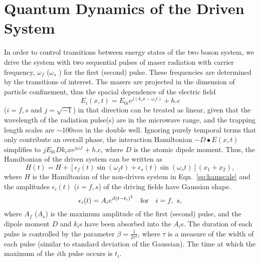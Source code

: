 \documentclass{article}
\begin{document}
\section{\label{sec:5} Quantum Dynamics of the Driven System}
%
%
In order to control transitions between energy states of the two boson system, we drive the 
system with  two sequential pulses of maser radiation with carrier frequency, ${\omega}_f$ (${\omega}_s$ ) for the first  (second)  pulse. These frequencies are determined by the transitions of interest. The masers are projected in the dimension of particle confinement, thus the spacial dependence of the electric field
\begin{equation}
E_i(x,t) = E_{0i} e^{j(k_ix-\omega_it)} + h.c
\end{equation}
($i=f,s$ and $j=\sqrt{-1}$) in that direction can be treated as linear, given that the wavelength of the radiation pulse(s) are in the microwave range, and the trapping length scales are $\sim 100 nm$ in the double well. Ignoring purely temporal terms that only contribute an overall phase, the interaction Hamiltonian $- D\bullet E(x,t)$ simplifies to $jE_{0i}Dk_i x e^{j\omega_i t} + h.c$, where $D$ is the atomic dipole moment. Thus, the Hamiltonian of the driven system can be written as
%
\begin{equation}
H(t)=H+[\epsilon_f(t)\sin(\omega_ft)+\epsilon_s(t)\sin(\omega_st)](x_1+x_2),
\label{eq:drivham}
\end{equation}
%
where $H$ is the Hamiltonian of the non-driven system in Eqn.~\eqref{eq:hamscale} and the amplitudes $\epsilon_i(t)$ ($i=f,s$) of the driving fields have Gaussian shape. 
%
\begin{equation}
\epsilon_{i}(t)= A_i e^{{\beta}(t-t_{i})^2}~~~{\rm for}~~~i=f,~s,
\label{eq:drivensystem}
\end{equation}
%
where $A_{f}$ ($A_s$) is the maximum amplitude of the first (second) pulse, and the dipole moment $D$ and $k_i$s have been absorbed into the $A_i$s. The duration of each pulse is controlled by the parameter $\beta=\frac{1}{2{\tau}^2}$, where ${\tau}$ is a measure of the width of each pulse (similar to standard deviation of the Gaussian). The time at which the maximum of the $i$th  pulse occurs is $t_i$. 
\end{document}
